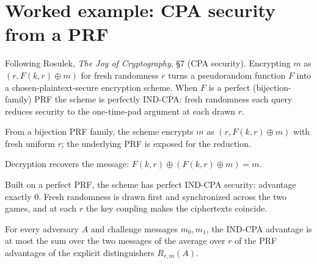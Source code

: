 \chapter{Worked example: CPA security from a PRF}

Following Rosulek, \emph{The Joy of Cryptography}, §7 (CPA security). Encrypting
$m$ as $(r, F(k, r) \oplus m)$ for fresh randomness $r$ turns a pseudorandom
function $F$ into a chosen-plaintext-secure encryption scheme. When $F$ is a
perfect (bijection-family) PRF the scheme is perfectly IND-CPA: fresh randomness
each query reduces security to the one-time-pad argument at each drawn $r$.

\begin{definition}
  \label{def:cpafromprf}
  \leanok
  From a bijection PRF family, the scheme encrypts $m$ as $(r, F(k, r) \oplus m)$
  with fresh uniform $r$; the underlying PRF is exposed for the reduction.
\end{definition}

\begin{theorem}[Correctness]
  \label{thm:cpafromprf-correct}
  \leanok
  Decryption recovers the message: $F(k, r) \oplus (F(k, r) \oplus m) = m$.
\end{theorem}

\begin{theorem}
  \label{thm:cpafromprf-perfect}
  \leanok
  Built on a perfect PRF, the scheme has perfect IND-CPA security: advantage
  exactly $0$. Fresh randomness is drawn first and synchronized across the two
  games, and at each $r$ the key coupling makes the ciphertexts coincide.
\end{theorem}

\begin{theorem}
  \label{thm:cpafromprf-bound}
  \leanok
  For every adversary $A$ and challenge messages $m_0, m_1$, the IND-CPA advantage
  is at most the sum over the two messages of the average over $r$ of the PRF
  advantages of the explicit distinguishers $R_{r,m}(A)$.
\end{theorem}

